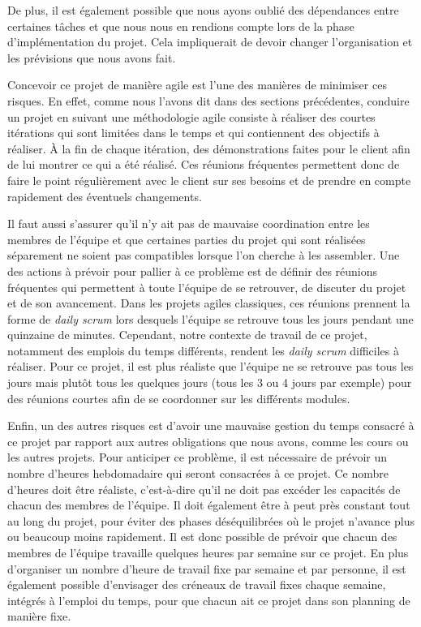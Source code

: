\documentclass{article}
\begin{document}
De plus, il est également possible que nous ayons oublié des dépendances entre certaines tâches et que nous nous en rendions compte lors de 
la phase d'implémentation du projet. Cela impliquerait de devoir changer l'organisation et les prévisions que nous avons fait.

Concevoir ce projet de manière agile est l'une des manières de minimiser ces risques. En effet, comme nous l'avons dit dans des sections précédentes, conduire un projet en suivant une méthodologie
agile consiste à réaliser des courtes itérations qui sont limitées dans le temps et qui contiennent des objectifs à réaliser. À la fin de chaque itération,
des démonstrations faites pour le client afin de lui montrer ce qui a été réalisé. Ces réunions fréquentes permettent donc de faire le point régulièrement avec le client sur 
ses besoins et de prendre en compte rapidement des éventuels changements.

Il faut aussi s'assurer qu'il n'y ait pas de mauvaise coordination entre les membres de l'équipe et que certaines parties du projet qui sont réalisées
séparement ne soient pas compatibles lorsque l'on cherche à les assembler. Une des actions à prévoir pour pallier à ce problème est de définir des réunions fréquentes
qui permettent à toute l'équipe de se retrouver, de discuter du projet et de son avancement. Dans les projets agiles classiques, ces réunions prennent la forme de 
\textit{daily scrum} lors desquels l'équipe se retrouve tous les jours pendant une quinzaine de minutes. Cependant, notre contexte de travail de ce projet, notamment des emplois
du temps différents, rendent les \textit{daily scrum} difficiles à réaliser. Pour ce projet, il est plus réaliste que l'équipe ne se retrouve pas tous les jours mais plutôt tous les
quelques jours (tous les 3 ou 4 jours par exemple) pour des réunions courtes afin de se coordonner sur les différents modules.

Enfin, un des autres risques est d'avoir une mauvaise gestion du temps consacré à ce projet par rapport aux autres obligations que nous avons,
comme les cours ou les autres projets.  Pour anticiper ce problème, il est nécessaire de prévoir un nombre d'heures hebdomadaire qui seront consacrées à ce projet.
Ce nombre d'heures doit être réaliste, c'est-à-dire qu'il ne doit pas excéder les capacités de chacun des membres de l'équipe.
Il doit également être à peut près constant tout au long du projet, pour éviter des phases déséquilibrées où le projet n'avance plus ou beaucoup moins rapidement.
Il est donc possible de prévoir que chacun des membres de l'équipe travaille quelques heures par semaine sur ce projet.
En plus d'organiser un nombre d'heure de travail fixe par semaine et par personne, il est également possible d'envisager des créneaux de travail fixes
chaque semaine, intégrés à l'emploi du temps, pour que chacun ait ce projet dans son planning de manière fixe.
\end{document}
